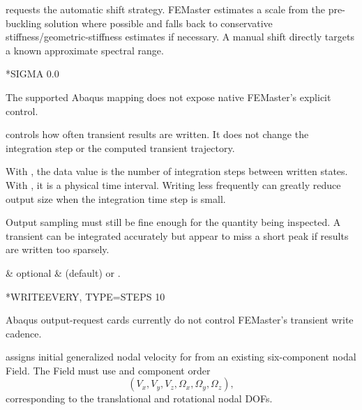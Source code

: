 requests the automatic shift strategy. FEMaster estimates a scale from the pre-buckling solution where possible and falls back to conservative stiffness/geometric-stiffness estimates if necessary. A manual shift directly targets a known approximate spectral range.

\exampleheading
\begin{dialectexamples}
\begin{femasterdeck}
*SIGMA
0.0
\end{femasterdeck}
\begin{noabaqus}
The supported Abaqus  mapping does not expose native FEMaster's explicit  control.
\end{noabaqus}
\end{dialectexamples}


 controls how often transient results are written. It does not change the integration step or the computed transient trajectory.

With , the data value is the number of integration steps between written states. With , it is a physical time interval. Writing less frequently can greatly reduce output size when the integration time step is small.

Output sampling must still be fine enough for the quantity being inspected. A transient can be integrated accurately but appear to miss a short peak if results are written too sparsely.

\begin{keywordparameters}
 & optional &  (default) or . \\
\end{keywordparameters}

\exampleheading
\begin{dialectexamples}
\begin{femasterdeck}
*WRITEEVERY, TYPE=STEPS
10
\end{femasterdeck}
\begin{noabaqus}
Abaqus output-request cards currently do not control FEMaster's transient write cadence.
\end{noabaqus}
\end{dialectexamples}


 assigns initial generalized nodal velocity for  from an existing six-component nodal Field. The Field must use  and component order
\[
(V_x,V_y,V_z,\Omega_x,\Omega_y,\Omega_z),
\]
corresponding to the translational and rotational nodal DOFs.

